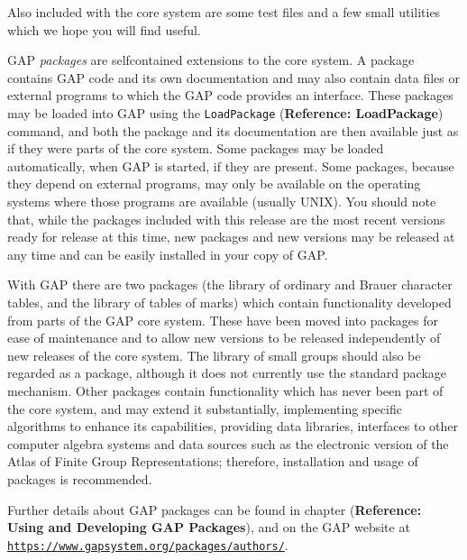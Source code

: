 \documentclass[a4paper,11pt]{report}
\begin{document}
{{ Also included with the core system are some test files and a few small
utilities which we hope you will find useful. 

 \textsf{GAP} \emph{packages} are self\texttt{}contained extensions to the core system. A package
contains \textsf{GAP} code and its own documentation and may also contain data files or external
programs to which the \textsf{GAP} code provides an interface. These packages may be loaded into \textsf{GAP} using the \texttt{LoadPackage} (\textbf{Reference: LoadPackage}) command, and both the package and its documentation are then available just as
if they were parts of the core system. Some packages may be loaded
automatically, when \textsf{GAP} is started, if they are present. Some packages, because they depend on
external programs, may only be available on the operating systems where those
programs are available (usually UNIX). You should note that, while the
packages included with this release are the most recent versions ready for
release at this time, new packages and new versions may be released at any
time and can be easily installed in your copy of \textsf{GAP}. 

  With \textsf{GAP} there are two packages (the library of ordinary and Brauer character tables,
and the library of tables of marks) which contain functionality developed from
parts of the \textsf{GAP} core system. These have been moved into packages for ease of maintenance and
to allow new versions to be released independently of new releases of the core
system. The library of small groups should also be regarded as a package,
although it does not currently use the standard package mechanism. Other
packages contain functionality which has never been part of the core system,
and may extend it substantially, implementing specific algorithms to enhance
its capabilities, providing data libraries, interfaces to other computer
algebra systems and data sources such as the electronic version of the Atlas
of Finite Group Representations; therefore, installation and usage of packages
is recommended. 

 Further details about \textsf{GAP} packages can be found in chapter  (\textbf{Reference: Using and Developing GAP Packages}), and on the \textsf{GAP} website at \href{https://www.gap-system.org/packages/authors/} {\texttt{https://www.gap\texttt{}system.org/packages/authors/}}.    }

 }

             

  
\end{document}
